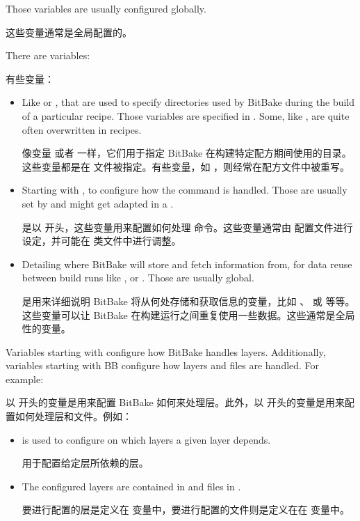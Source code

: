 Those variables are usually configured globally.

这些变量通常是全局配置的。

There are variables:

有些变量：

\begin{itemize}
\setlength\itemsep{1.0em}
    
\item Like  or , that are used to specify directories used by BitBake during the build of a particular recipe. Those variables are specified in . Some, like , are quite often overwritten in recipes.

\medskip
像变量  或者  一样，它们用于指定 BitBake 在构建特定配方期间使用的目录。这些变量都是在  文件被指定。有些变量，如 ，则经常在配方文件中被重写。

\item Starting with , to configure how the  command is handled. Those are usually set by  and might get adapted in a .

\medskip
是以  开头，这些变量用来配置如何处理  命令。这些变量通常由  配置文件进行设定，并可能在  类文件中进行调整。

\item Detailing where BitBake will store and fetch information from, for data reuse between build runs like ,  or . Those are usually global.

\medskip
是用来详细说明 BitBake 将从何处存储和获取信息的变量，比如 、 或  等等。这些变量可以让 BitBake 在构建运行之间重复使用一些数据。这些通常是全局性的变量。
\end{itemize}


Variables starting with  configure how BitBake handles layers. Additionally, variables starting with BB configure how layers and files are handled. For example:

以  开头的变量是用来配置 BitBake 如何来处理层。此外，以  开头的变量是用来配置如何处理层和文件。例如：

\begin{itemize}
\setlength\itemsep{1.0em}
   
\item {} is used to configure on which layers a given layer depends.

\medskip
{} 用于配置给定层所依赖的层。

\item The configured layers are contained in  and files in .

\medskip
要进行配置的层是定义在  变量中，要进行配置的文件则是定义在在  变量中。
\end{itemize}

